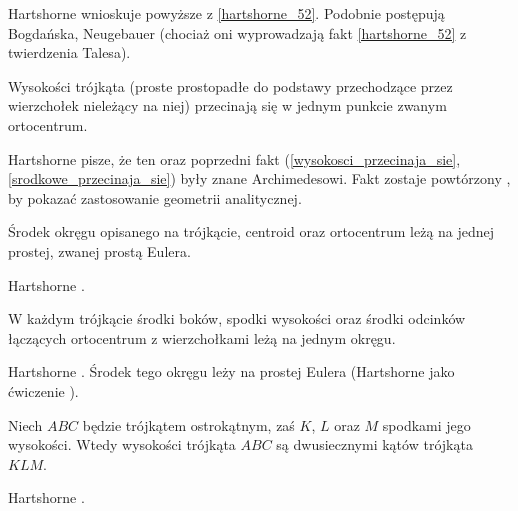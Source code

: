 Hartshorne \cite[s. 53, 54]{hartshorne2000} wnioskuje powyższe z \ref{hartshorne_52}.
Podobnie postępują Bogdańska, Neugebauer (chociaż oni wyprowadzają fakt \ref{hartshorne_52} z twierdzenia Talesa).

\begin{proposition}
	\label{wysokosci_przecinaja_sie}
	Wysokości trójkąta (proste prostopadłe do podstawy przechodzące przez wierzchołek nieleżący na niej) przecinają się w jednym punkcie zwanym ortocentrum.
\end{proposition}

Hartshorne \cite[s. 52, 54]{hartshorne2000} pisze, że ten oraz poprzedni fakt (\ref{wysokosci_przecinaja_sie}, \ref{srodkowe_przecinaja_sie}) były znane Archimedesowi.
Fakt zostaje powtórzony \cite[s. 119-120]{hartshorne2000}, by pokazać zastosowanie geometrii analitycznej.

\begin{proposition}
	\label{prosta_eulera}
	Środek okręgu opisanego na trójkącie, centroid oraz ortocentrum leżą na jednej prostej, zwanej prostą Eulera.
\end{proposition}

Hartshorne \cite[s. 54, 55]{hartshorne2000}.

\begin{proposition}
	\label{okrag_dziewieciu_punktow}
	W każdym trójkącie środki boków, spodki wysokości oraz środki odcinków łączących ortocentrum z wierzchołkami leżą na jednym okręgu.
\end{proposition}

Hartshorne \cite[s. 57]{hartshorne2000}.
Środek tego okręgu leży na prostej Eulera (Hartshorne jako ćwiczenie \cite[s. 60]{hartshorne2000}).

\begin{proposition}
	\label{orthic_triangle}
	Niech $ABC$ będzie trójkątem ostrokątnym, zaś $K$, $L$ oraz $M$ spodkami jego wysokości.
	Wtedy wysokości trójkąta $ABC$ są dwusiecznymi kątów trójkąta $KLM$.
\end{proposition}

Hartshorne \cite[s. 58]{hartshorne2000}.
